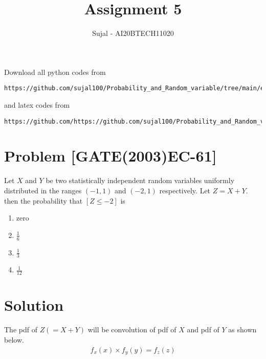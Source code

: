\documentclass[journal,12pt,twocolumn]{IEEEtran}
\begin{document}
\let\StandardTheFigure\thefigure
\let\vec\mathbf
\renewcommand{\thefigure}{\theproblem}
\def\putbox#1#2#3{\makebox[0in][l]{\makebox[#1][l]{}\raisebox{\baselineskip}[0in][0in]{\raisebox{#2}[0in][0in]{#3}}}}
     \def\rightbox#1{\makebox[0in][r]{#1}}
     \def\centbox#1{\makebox[0in]{#1}}
     \def\topbox#1{\raisebox{-\baselineskip}[0in][0in]{#1}}
     \def\midbox#1{\raisebox{-0.5\baselineskip}[0in][0in]{#1}}
\vspace{3cm}
\title{Assignment 5}
\author{Sujal - AI20BTECH11020}
\maketitle
\newpage
\bigskip
\renewcommand{\thefigure}{\theenumi}
\renewcommand{\thetable}{\theenumi}
Download all python codes from 
\begin{lstlisting}
https://github.com/sujal100/Probability_and_Random_variable/tree/main/exercise_5/codes
\end{lstlisting}

and latex codes from 

\begin{lstlisting}
https://github.com/https://github.com/sujal100/Probability_and_Random_variable/blob/main/exercise_5/exercise_5_main_tex.tex
\end{lstlisting}
\section{Problem [GATE(2003)EC-61]}
Let $X$ and $Y$ be two statistically independent random variables uniformly
distributed in the ranges $(-1,1)$ and $(-2,1)$ respectively. Let $Z = X + Y.$ then the probability that $[Z\leq-2]$ is
\begin{enumerate}[label=\alph*)]
\item zero
\item $\frac{1}{6}$
\item $\frac{1}{3}$
\item $\frac{1}{12}$
\end{enumerate}
\section{Solution}
The pdf of $Z(=X+Y)$ will be convolution of pdf of $X$ and pdf of $Y$ as shown below.
\begin{align}
f_{x}( x)\times f_{y}(y)=f_{z}(z)
\end{align}

\end{document}
